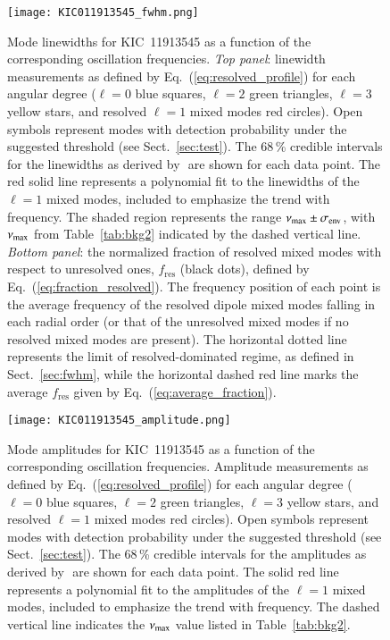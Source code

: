 \begin{figure}
   \centering
   \texttt{[image: KIC011913545\_fwhm.png]}
      \caption{Mode linewidths for KIC~11913545 as a function of the corresponding oscillation frequencies. \textit{Top panel}: linewidth measurements as defined by Eq.~(\ref{eq:resolved_profile}) for each angular degree ($\ell = 0$ blue squares, $\ell = 2$ green triangles, $\ell = 3$ yellow stars, and resolved $\ell = 1$ mixed modes red circles). Open symbols represent modes with detection probability under the suggested threshold (see Sect.~\ref{sec:test}). The 68\,\% credible intervals for the linewidths as derived by \diamonds\,\,are shown for each data point. The red solid line represents a polynomial fit to the linewidths of the $\ell = 1$ mixed modes, included to emphasize the trend with frequency. The shaded region represents the range $\nu_\mathrm{max} \pm \sigma_\mathrm{env}$, with $\nu_\mathrm{max}$ from Table~\ref{tab:bkg2} indicated by the dashed vertical line. \textit{Bottom panel}: the normalized fraction of resolved mixed modes with respect to unresolved ones, $f_\mathrm{res}$ (black dots), defined by Eq.~(\ref{eq:fraction_resolved}). The frequency position of each point is the average frequency of the resolved dipole mixed modes falling in each radial order (or that of the unresolved mixed modes if no resolved mixed modes are present). The horizontal dotted line represents the limit of resolved-dominated regime, as defined in Sect.~\ref{sec:fwhm}, while the horizontal dashed red line marks the average $f_\mathrm{res}$ given by Eq.~(\ref{eq:average_fraction}).}
    \label{fig:11913545fwhm}
\end{figure}

\begin{figure}
   \centering
   \texttt{[image: KIC011913545\_amplitude.png]}
      \caption{Mode amplitudes for KIC~11913545 as a function of the corresponding oscillation frequencies. Amplitude measurements as defined by Eq.~(\ref{eq:resolved_profile}) for each angular degree ($\ell = 0$ blue squares, $\ell = 2$ green triangles, $\ell = 3$ yellow stars, and resolved $\ell = 1$ mixed modes red circles). Open symbols represent modes with detection probability under the suggested threshold (see Sect.~\ref{sec:test}). The 68\,\% credible intervals for the amplitudes as derived by \diamonds\,\,are shown for each data point. The solid red line represents a polynomial fit to the amplitudes of the $\ell = 1$ mixed modes, included to emphasize the trend with frequency. The dashed vertical line indicates the $\nu_\mathrm{max}$ value listed in Table~\ref{tab:bkg2}.}
    \label{fig:11913545amplitude}
\end{figure}
\clearpage


